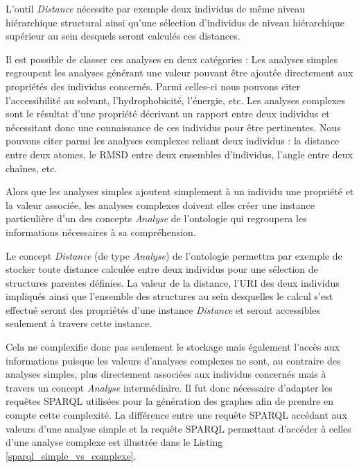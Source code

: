 
L'outil \textit{Distance} nécessite par exemple deux individus de même niveau hiérarchique structural ainsi qu'une sélection d'individus de niveau hiérarchique supérieur au sein desquels seront calculés ces distances. 

Il est possible de classer ces analyses en deux catégories : Les analyses simples regroupent les analyses générant une valeur pouvant être ajoutée directement aux propriétés des individus concernés. Parmi celles-ci nous pouvons citer l'accessibilité au solvant, l'hydrophobicité, l'énergie, etc. 
Les analyses complexes sont le résultat d'une propriété décrivant un rapport entre deux individus et nécessitant donc une connaissance de ces individus pour être pertinentes. Nous pouvons citer parmi les analyses complexes reliant deux individus : la distance entre deux atomes, le RMSD entre deux ensembles d'individus, l'angle entre deux chaînes, etc.

Alors que les analyses simples ajoutent simplement à un individu une propriété et la valeur associée, les analyses complexes doivent elles créer une instance particulière d'un des concepts \textit{Analyse} de l'ontologie qui regroupera les informations nécessaires à sa compréhension. 

Le concept \textit{Distance} (de type \textit{Analyse}) de l'ontologie permettra par exemple de stocker toute distance calculée entre deux individus pour une sélection de structures parentes définies. La valeur de la distance, l'URI des deux individus impliqués ainsi que l'ensemble des structures au sein desquelles le calcul s'est effectué seront des propriétés d'une instance \textit{Distance} et seront accessibles seulement à travers cette instance. 

Cela ne complexifie donc pas seulement le stockage mais également l'accès aux informations puisque les valeurs d'analyses complexes ne sont, au contraire des analyses simples, plus directement associées aux individus concernés mais à travers un concept \textit{Analyse} intermédiaire. Il fut donc nécessaire d'adapter les requêtes SPARQL utilisées pour la génération des graphes afin de prendre en compte cette complexité. La différence entre une requête SPARQL accédant aux valeurs d'une analyse simple et la requête SPARQL permettant d'accéder à celles d'une analyse complexe est illustrée dans le Listing \ref{sparql_simple_vs_complexe}.

